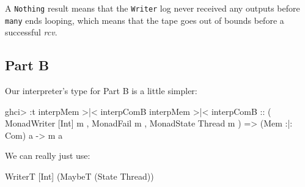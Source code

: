\documentclass[]{article}
\newenvironment{Shaded}{}{}
\newcommand{\CommentTok}[1]{\textcolor[rgb]{0.38,0.63,0.69}{\textit{#1}}}
\newcommand{\DataTypeTok}[1]{\textcolor[rgb]{0.56,0.13,0.00}{#1}}
\newcommand{\FunctionTok}[1]{\textcolor[rgb]{0.02,0.16,0.49}{#1}}
\newcommand{\NormalTok}[1]{#1}
\newcommand{\OperatorTok}[1]{\textcolor[rgb]{0.40,0.40,0.40}{#1}}
\newcommand{\OtherTok}[1]{\textcolor[rgb]{0.00,0.44,0.13}{#1}}
\begin{document}
\begin{Shaded}
\end{Shaded}

A \texttt{Nothing} result means that the \texttt{Writer} log never received any
outputs before \texttt{many} ends looping, which means that the tape goes out of
bounds before a successful \emph{rcv}.

\subsection{Part B}\label{part-b}

Our interpreter's type for Part B is a little simpler:

\begin{Shaded}
\begin{Highlighting}[]
\NormalTok{ghci}\OperatorTok{\textgreater{}} \OperatorTok{:}\NormalTok{t interpMem }\OperatorTok{\textgreater{}|\textless{}}\NormalTok{ interpComB}
\NormalTok{interpMem }\OperatorTok{\textgreater{}|\textless{}}\NormalTok{ interpComB}
\OtherTok{    ::}\NormalTok{ ( }\DataTypeTok{MonadWriter}\NormalTok{ [}\DataTypeTok{Int}\NormalTok{] m}
\NormalTok{       , }\DataTypeTok{MonadFail}\NormalTok{ m}
\NormalTok{       , }\DataTypeTok{MonadState} \DataTypeTok{Thread}\NormalTok{ m}
\NormalTok{       )}
    \OtherTok{=\textgreater{}}\NormalTok{ (}\DataTypeTok{Mem} \OperatorTok{:|:} \DataTypeTok{Com}\NormalTok{) a}
    \OtherTok{{-}\textgreater{}}\NormalTok{ m a}
\end{Highlighting}
\end{Shaded}

We can really just use:

\begin{Shaded}
\begin{Highlighting}[]
\DataTypeTok{WriterT}\NormalTok{ [}\DataTypeTok{Int}\NormalTok{] (}\DataTypeTok{MaybeT}\NormalTok{ (}\DataTypeTok{State} \DataTypeTok{Thread}\NormalTok{))}
\end{Highlighting}
\end{Shaded}
\end{document}
